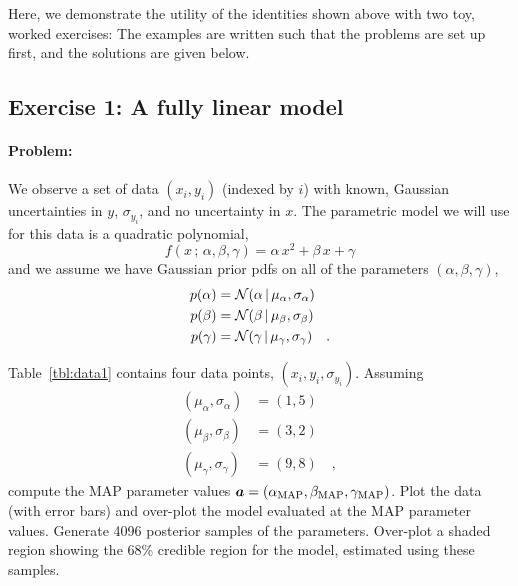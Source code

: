 Here, we demonstrate the utility of the identities shown above with two toy,
worked exercises: The examples are written such that the problems are set up
first, and the solutions are given below.


\subsection{Exercise 1: A fully linear model}

\paragraph{Problem:} We observe a set of data $(x_i, y_i)$ (indexed by $i$) with
known, Gaussian uncertainties in $y$, $\sigma_{y_i}$, and no uncertainty in $x$.
The parametric model we will use for this data is a quadratic polynomial,
\begin{equation}
  f(x \,;\, \alpha, \beta, \gamma) = \alpha\,x^2 + \beta\,x + \gamma
\end{equation}
and we assume we have Gaussian prior pdfs on all of the parameters $(\alpha,
\beta, \gamma)$,
\begin{align}
  p(\alpha) &= \mathcal{N}\!\,(\alpha \,|\, \mu_\alpha, \sigma_\alpha)\\
  p(\beta) &= \mathcal{N}\!\,(\beta \,|\, \mu_\beta, \sigma_\beta)\\
  p(\gamma) &= \mathcal{N}\!\,(\gamma \,|\, \mu_\gamma, \sigma_\gamma)
  \quad .
\end{align}

Table~\ref{tbl:data1} contains four data points, $(x_i, y_i, \sigma_{y_i})$.
Assuming
\begin{align}
  (\mu_\alpha, \sigma_\alpha) &= (1, 5)\\
  (\mu_\beta, \sigma_\beta) &= (3, 2)\\
  (\mu_\gamma, \sigma_\gamma) &= (9, 8) \quad ,
\end{align}
compute the MAP parameter values $\boldsymbol{a} = (\alpha_{\rm MAP}, \beta_{\rm MAP},
\gamma_{\rm MAP})$.
Plot the data (with error bars) and over-plot the model evaluated at the
MAP parameter values.
Generate 4096 posterior samples of the parameters.
Over-plot a shaded region showing the 68\% credible region for the model,
estimated using these samples.

